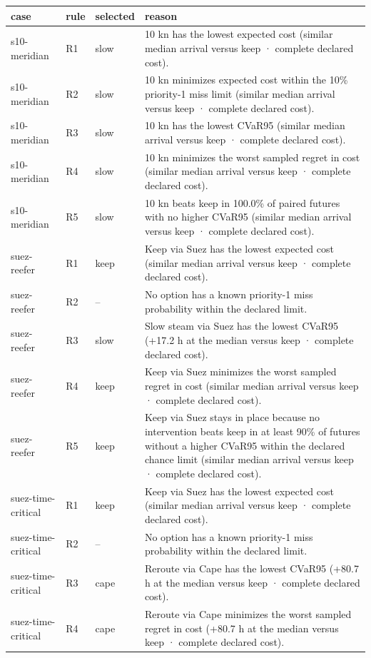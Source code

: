\begin{tabular}{llll}
\toprule
case & rule & selected & reason \\
\midrule
s10-meridian & R1 & slow & 10 kn has the lowest expected cost (similar median arrival versus keep · complete declared cost). \\
s10-meridian & R2 & slow & 10 kn minimizes expected cost within the 10\% priority-1 miss limit (similar median arrival versus keep · complete declared cost). \\
s10-meridian & R3 & slow & 10 kn has the lowest CVaR95 (similar median arrival versus keep · complete declared cost). \\
s10-meridian & R4 & slow & 10 kn minimizes the worst sampled regret in cost (similar median arrival versus keep · complete declared cost). \\
s10-meridian & R5 & slow & 10 kn beats keep in 100.0\% of paired futures with no higher CVaR95 (similar median arrival versus keep · complete declared cost). \\
suez-reefer & R1 & keep & Keep via Suez has the lowest expected cost (similar median arrival versus keep · complete declared cost). \\
suez-reefer & R2 & -- & No option has a known priority-1 miss probability within the declared limit. \\
suez-reefer & R3 & slow & Slow steam via Suez has the lowest CVaR95 (+17.2 h at the median versus keep · complete declared cost). \\
suez-reefer & R4 & keep & Keep via Suez minimizes the worst sampled regret in cost (similar median arrival versus keep · complete declared cost). \\
suez-reefer & R5 & keep & Keep via Suez stays in place because no intervention beats keep in at least 90\% of futures without a higher CVaR95 within the declared chance limit (similar median arrival versus keep · complete declared cost). \\
suez-time-critical & R1 & keep & Keep via Suez has the lowest expected cost (similar median arrival versus keep · complete declared cost). \\
suez-time-critical & R2 & -- & No option has a known priority-1 miss probability within the declared limit. \\
suez-time-critical & R3 & cape & Reroute via Cape has the lowest CVaR95 (+80.7 h at the median versus keep · complete declared cost). \\
suez-time-critical & R4 & cape & Reroute via Cape minimizes the worst sampled regret in cost (+80.7 h at the median versus keep · complete declared cost). \\

\end{tabular}

